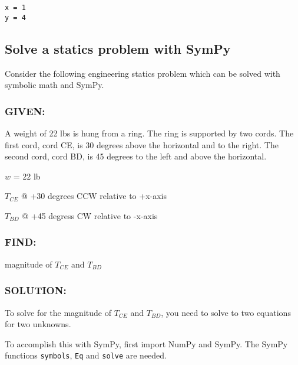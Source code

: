 \documentclass{book}
\newcommand{\passthrough}[1]{#1}
\begin{document}
    \begin{Verbatim}[commandchars=\\\{\}]
x = 1
y = 4

    \end{Verbatim}


    
        \hypertarget{solve-a-statics-problem-with-sympy}{%
\subsection{Solve a statics problem with
SymPy}\label{solve-a-statics-problem-with-sympy}}
    




    
        Consider the following engineering statics problem which can be solved
with symbolic math and SymPy.

\hypertarget{given}{%
\subsubsection{GIVEN:}\label{given}}

A weight of 22 lbs is hung from a ring. The ring is supported by two
cords. The first cord, cord CE, is 30 degrees above the horizontal and
to the right. The second cord, cord BD, is 45 degrees to the left and
above the horizontal.

\(w\) = 22 lb

\(T_{CE}\) @ +30 degrees CCW relative to +x-axis

\(T_{BD}\) @ +45 degress CW relative to -x-axis

\hypertarget{find}{%
\subsubsection{FIND:}\label{find}}

magnitude of \(T_{CE}\) and \(T_{BD}\)
    




    
        \hypertarget{solution}{%
\subsubsection{SOLUTION:}\label{solution}}

To solve for the magnitude of \(T_{CE}\) and \(T_{BD}\), you need to
solve to two equations for two unknowns.

To accomplish this with SymPy, first import NumPy and SymPy. The SymPy
functions \passthrough{\lstinline!symbols!},
\passthrough{\lstinline!Eq!} and \passthrough{\lstinline!solve!} are
needed.
    
\end{document}
